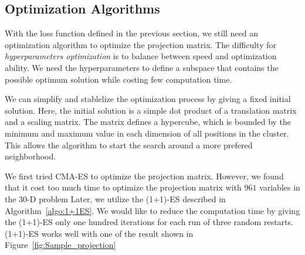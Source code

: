 




\subsection{Optimization Algorithms}

With the loss function defined in the previous section, 
we still need an optimization algorithm to optimize the projection matrix.
The difficulty for \textit{hyperparameters optimization} is to balance between speed and optimization ability.
We need the hyperparameters to define a subspace that contains the possible optimum solution while costing few computation time.

We can simplify and stablelize the optimization process by giving a fixed initial solution.
Here, the initial solution is a simple dot product of a translation matrix and a scaling matrix. 
The matrix defines a hypercube, which is bounded by the minimum and maximum value in each dimension of all positions in the cluster.
This allows the algorithm to start the search around a more prefered neighborhood.

We first tried CMA-ES to optimize the projection matrix.
However, we found that it cost too much time to optimize the projection matrix with $961$ variables in the $30$-D problem
Later, we utilize the (1+1)-ES described in Algorithm~\ref{algo:1+1ES}.
We would like to reduce the computation time by giving the (1+1)-ES only one hundred iterations for each run of three random restarts.
(1+1)-ES works well with one of the result shown in Figure~\ref{fig:Sample_projection}

